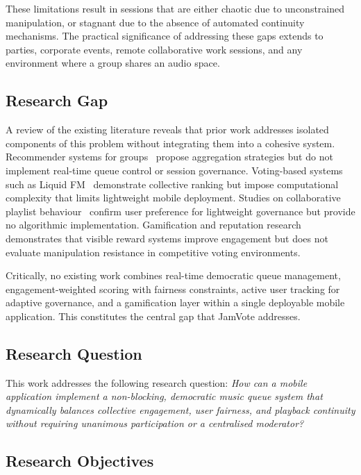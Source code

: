 \documentclass[pdflatex,sn-mathphys-num,iicol]{sn-jnl}
\theoremstyle{thmstyleone}%
\theoremstyle{thmstyletwo}%
\theoremstyle{thmstylethree}%
\begin{document}
These limitations result in sessions that are either chaotic due to unconstrained
manipulation, or stagnant due to the absence of automated continuity mechanisms. The
practical significance of addressing these gaps extends to parties, corporate events,
remote collaborative work sessions, and any environment where a group shares an audio
space.

\subsection{Research Gap}

A review of the existing literature reveals that prior work addresses isolated components
of this problem without integrating them into a cohesive system. Recommender systems for
groups~\cite{jamvote_group_context_mdpi, jamvote_recommendation_groups} propose
aggregation strategies but do not implement real-time queue control or session governance.
Voting-based systems such as Liquid FM~\cite{jamvote_arxiv_social_music} demonstrate
collective ranking but impose computational complexity that limits lightweight mobile
deployment. Studies on collaborative playlist
behaviour~\cite{jamvote_collaborative_playlists_study} confirm user preference for
lightweight governance but provide no algorithmic implementation. Gamification and
reputation research~\cite{jamvote_online_community_motivation, jamvote_gamification_works}
demonstrates that visible reward systems improve engagement but does not evaluate
manipulation resistance in competitive voting environments.

Critically, no existing work combines real-time democratic queue management,
engagement-weighted scoring with fairness constraints, active user tracking for adaptive
governance, and a gamification layer within a single deployable mobile application. This
constitutes the central gap that JamVote addresses.

\subsection{Research Question}

This work addresses the following research question: \textit{How can a mobile application
implement a non-blocking, democratic music queue system that dynamically balances
collective engagement, user fairness, and playback continuity without requiring unanimous
participation or a centralised moderator?}

\subsection{Research Objectives}
\end{document}
